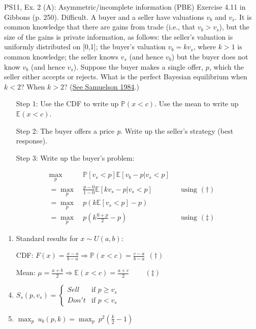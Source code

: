\begin{frame}{PS11, Ex. 2 (A): Asymmetric/incomplete information (PBE)}
    Exercise 4.11 in Gibbons (p. 250). Difficult. A buyer and a seller have valuations $v_b$ and $v_s$. It is common knowledge that there are gains from trade (i.e., that $v_b > v_s$), but the size of the gains is private information, as follows: the seller’s valuation is uniformly distributed on [0,1]; the buyer’s valuation $v_b = kv_s$, where $k > 1$ is common knowledge; the seller knows $v_s$ (and hence $v_b$) but the buyer does not know $v_b$ (and hence $v_s$). Suppose the buyer makes a single offer, $p$, which the seller either accepts or rejects. What is the perfect Bayesian equilibrium when $k < 2$? When $k > 2$? (\href{https://www.jstor.org/stable/1911195}{See Samuelson 1984}.) \vspace{-8pt}
    \begin{multicols}{2}
      \begin{itemize}
        \item[Step 1:] Use the CDF to write up $\mathbb{P}(x<c)$. Use the mean to write up $\mathbb{E}(x<c)$.
        \item[Step 2:] The buyer offers a price \textit{p}. Write up the seller's strategy (best response).
        \item[Step 3:] Write up the buyer's problem:
      \end{itemize} \vspace{-8pt}
      \begin{align*}
        \displaystyle{\max_p}&\ \mathbb{P}[v_s<p]\mathbb{E}[v_b-p|v_s<p]\\
       =\displaystyle{\max_p}&\ \frac{p-0}{1-0}\mathbb{E}[kv_s-p|v_s<p]&&\text{using }(\dagger)\\
       =\displaystyle{\max_p}&\ p\left(k\mathbb{E}[v_s<p]-p\right)\\
       =\displaystyle{\max_p}&\ p\left(k\frac{0+p}{2}-p\right)&&\text{using }(\ddagger)
      \end{align*}
      \vfill\null\columnbreak
      \begin{enumerate}
        \item Standard results for $x\sim U(a, b):$
        \item[CDF:] $F(x)=\frac{x-a}{b-a}\Rightarrow\mathbb{P}(x<c)=\frac{c-a}{b-a}\ \ (\dagger)$
        \item[Mean:] $\mu=\frac{a+b}{2}\Rightarrow\mathbb{E}(x<c)=\frac{a+c}{2}\quad\quad\ (\ddagger)$
        \item $S_s(p,v_s)=\left\{\begin{array}{ll}
          Sell  & \text{if }p\geq v_s \\
          Don't & \text{if }p < v_s
        \end{array}\right.$
        \item $\displaystyle{\max_p}\ u_b(p,k)=\displaystyle{\max_p}\ p^2\left(\frac{k}{2}-1\right)$
      \end{enumerate}
      \vfill\null
    \end{multicols}
\end{frame}
